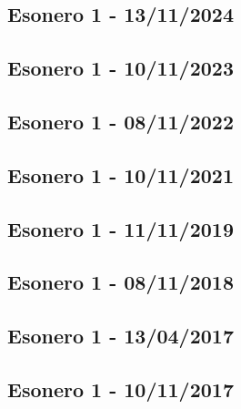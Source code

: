 \subsection{Esonero 1 - 13/11/2024}


\newpage

\subsection{Esonero 1 - 10/11/2023}


\newpage

\subsection{Esonero 1 - 08/11/2022}


\newpage

\subsection{Esonero 1 - 10/11/2021}



\newpage

\subsection{Esonero 1 - 11/11/2019}


\newpage

\subsection{Esonero 1 - 08/11/2018}


\newpage

\subsection{Esonero 1 - 13/04/2017}


\newpage

\subsection{Esonero 1 - 10/11/2017}


